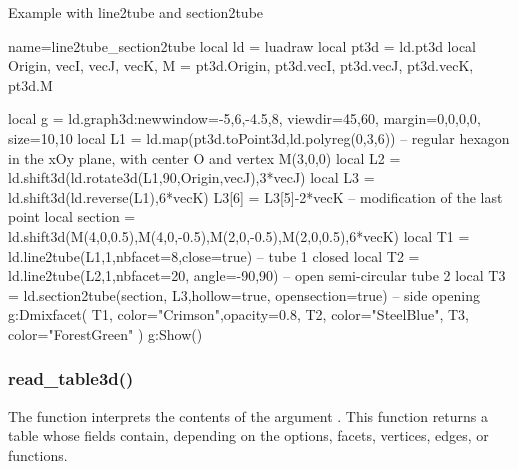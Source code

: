 \begin{demo}{Example with line2tube and section2tube}
\begin{luadraw}{name=line2tube_section2tube}
local ld = luadraw
local pt3d = ld.pt3d
local Origin, vecI, vecJ, vecK, M = pt3d.Origin, pt3d.vecI, pt3d.vecJ, pt3d.vecK, pt3d.M

local g = ld.graph3d:new{window={-5,6,-4.5,8}, viewdir={45,60}, margin={0,0,0,0}, size={10,10}}
local L1 = ld.map(pt3d.toPoint3d,ld.polyreg(0,3,6)) -- regular hexagon in the xOy plane, with center O and vertex M(3,0,0)
local L2 = ld.shift3d(ld.rotate3d(L1,90,{Origin,vecJ}),3*vecJ)
local L3 = ld.shift3d(ld.reverse(L1),6*vecK)
L3[6] = L3[5]-2*vecK -- modification of the last point
local section = ld.shift3d({M(4,0,0.5),M(4,0,-0.5),M(2,0,-0.5),M(2,0,0.5)},6*vecK)
local T1 = ld.line2tube(L1,1,{nbfacet=8,close=true}) -- tube 1 closed
local T2 = ld.line2tube(L2,1,{nbfacet=20, angle={-90,90}}) -- open semi-circular tube 2
local T3 = ld.section2tube(section, L3,{hollow=true, opensection=true}) -- side opening
g:Dmixfacet( T1, {color="Crimson",opacity=0.8}, T2, {color="SteelBlue"}, T3, {color="ForestGreen"} )
g:Show()
\end{luadraw}
\end{demo}

\subsubsection{read\_table3d()}

The function  interprets the contents of the argument . This function returns a table whose fields contain, depending on the options, facets, vertices, edges, or functions.

